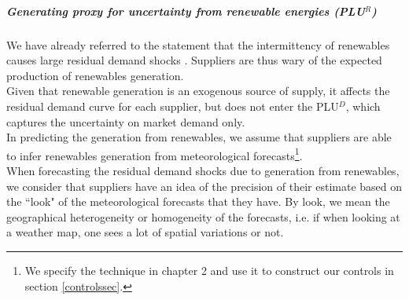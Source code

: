 \subparagraph{Generating proxy for uncertainty from renewable energies (PLU$^R$)}
\label{proxyautocorrel}

We have already referred to the statement that the intermittency of renewables causes large residual demand shocks \cite{epexwebsite1}. Suppliers are thus wary of the expected production of renewables generation. \\

Given that renewable generation is an exogenous source of supply, it affects the residual demand curve for each supplier, but does not enter the PLU$^D$, which captures the uncertainty on market demand only. \\

In predicting the generation from renewables, we assume that suppliers are able to infer renewables generation from meteorological forecasts\footnote{We specify the technique in chapter 2 and use it to construct our controls in section \ref{controlssec}.}.\\

When forecasting the residual demand shocks due to generation from renewables, we consider that suppliers have an idea of the precision of their estimate based on the ``look" of the meteorological forecasts that they have. By look, we mean the geographical heterogeneity or homogeneity of the forecasts, i.e. if when looking at a weather map, one sees a lot of spatial variations or not. \\

